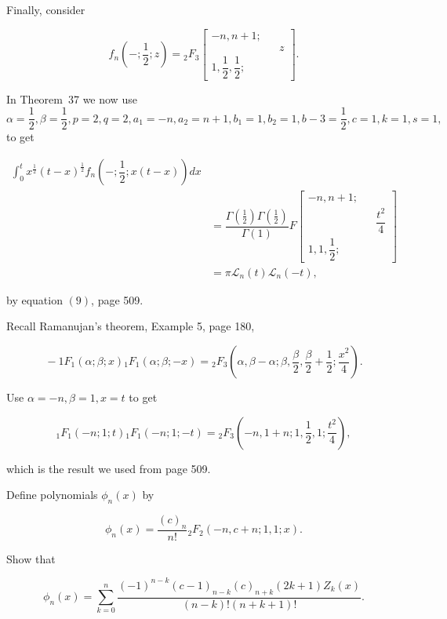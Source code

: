 \begin{solution}
Finally, consider

$$f_n \left( -; \dfrac{1}{2}; z \right) = {}_2F_3 \left[ \begin{array}{rlr} 
-n, n+1; & & \\
& & z \\
1, \dfrac{1}{2}, \dfrac{1}{2};  & & 
\end{array} \right].$$

In Theorem~37 we now use $\alpha = \dfrac{1}{2}, \beta = \dfrac{1}{2}, p=2, q=2, a_1=-n, a_2=n+1, b_1=1, b_2=1, b-3 = \dfrac{1}{2}, c=1, k=1, s=1,$ to get

$$\begin{array}{ll}
\displaystyle\int_0^t x^{\frac{1}{2}} (t-x)^{\frac{1}{2}} f_n \left( -; \dfrac{1}{2}; x(t-x) \right) dx \\
&= \dfrac{\Gamma(\frac{1}{2}) \Gamma(\frac{1}{2})}{\Gamma(1)} F \left[ \begin{array}{rlr} 
-n, n+1; & & \\
& & \dfrac{t^2}{4} \\
1,1, \dfrac{1}{2}; & & 
\end{array} \right] \\
&= \pi \mathscr{L}_n(t) \mathscr{L}_n(-t),
\end{array}$$

by equation $(9)$, page 509.

Recall Ramanujan's theorem, Example 5, page 180,

$${}-1F_1(\alpha; \beta; x) {}_1F_1(\alpha;\beta;-x) = {}_2F_3 \left( \alpha, \beta-\alpha; \beta, \dfrac{\beta}{2}, \dfrac{\beta}{2}+\dfrac{1}{2}; \dfrac{x^2}{4} \right).$$

Use $\alpha=-n, \beta=1, x=t$ to get

$${}_1F_1(-n;1;t) {}_1F_1(-n;1;-t) = {}_2F_3 \left( -n, 1+n; 1, \dfrac{1}{2}, 1 ; \dfrac{t^2}{4} \right),$$

which is the result we used from page 509.
\end{solution}
\begin{problem}\label{problem12chapter18}
Define polynomials $\phi_n(x)$ by

$$\phi_n(x) = \dfrac{(c)_n}{n!} {}_2F_2(-n,c+n;1,1;x).$$

Show that

$$\phi_n(x) = \displaystyle\sum_{k=0}^n \dfrac{(-1)^{n-k} (c-1)_{n-k} (c)_{n+k} (2k+1)Z_k(x)}{(n-k)! (n+k+1)!}.$$
\end{problem}
